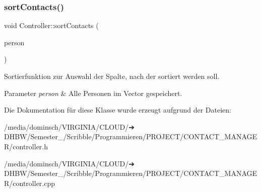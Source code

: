 \subsubsection{\texorpdfstring{sort\+Contacts()}{sortContacts()}}
{\footnotesize\ttfamily void Controller\+::sort\+Contacts (\begin{DoxyParamCaption}\item[{vector$<$ \hyperlink{classContactManager_1_1Person}{Person} $>$ \&}]{person }\end{DoxyParamCaption})}



Sortierfunktion zur Auswahl der Spalte, nach der sortiert werden soll.


\begin{DoxyParams}{Parameter}
{\em person} & Alle Personen im Vector gespeichert.\\
\hline
\end{DoxyParams}


Die Dokumentation für diese Klasse wurde erzeugt aufgrund der Dateien\+:\begin{DoxyCompactItemize}
\item 
/media/dominsch/\+V\+I\+R\+G\+I\+N\+I\+A/\+C\+L\+O\+U\+D/➔ D\+H\+B\+W/\+Semester\+\_/\+Scribble/\+Programmieren/\+P\+R\+O\+J\+E\+C\+T/\+C\+O\+N\+T\+A\+C\+T\+\_\+\+M\+A\+N\+A\+G\+E\+R/controller.\+h\item 
/media/dominsch/\+V\+I\+R\+G\+I\+N\+I\+A/\+C\+L\+O\+U\+D/➔ D\+H\+B\+W/\+Semester\+\_/\+Scribble/\+Programmieren/\+P\+R\+O\+J\+E\+C\+T/\+C\+O\+N\+T\+A\+C\+T\+\_\+\+M\+A\+N\+A\+G\+E\+R/controller.\+cpp\end{DoxyCompactItemize}
